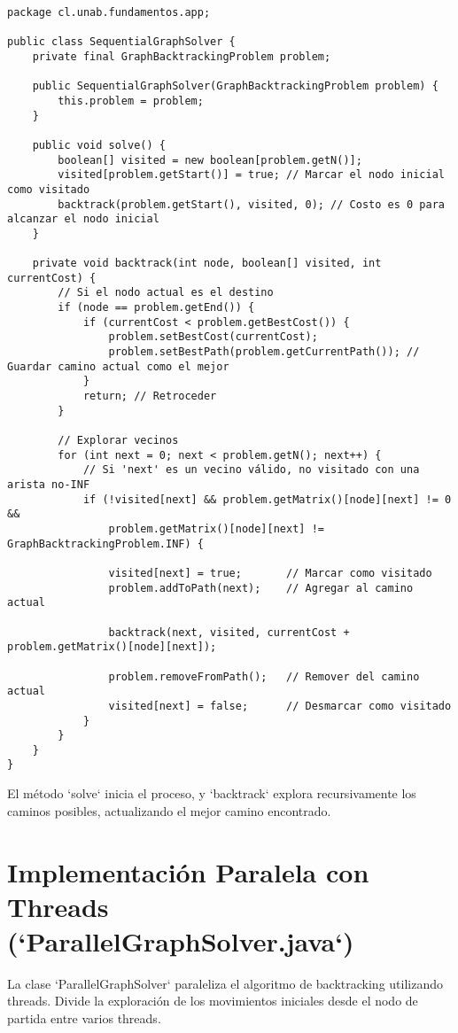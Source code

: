 \documentclass[12pt]{article}
\begin{document}
\begin{lstlisting}[caption={Algoritmo de Backtracking Secuencial en Java (`SequentialGraphSolver.java`)}]
package cl.unab.fundamentos.app;

public class SequentialGraphSolver {
    private final GraphBacktrackingProblem problem;

    public SequentialGraphSolver(GraphBacktrackingProblem problem) {
        this.problem = problem;
    }

    public void solve() {
        boolean[] visited = new boolean[problem.getN()];
        visited[problem.getStart()] = true; // Marcar el nodo inicial como visitado
        backtrack(problem.getStart(), visited, 0); // Costo es 0 para alcanzar el nodo inicial
    }

    private void backtrack(int node, boolean[] visited, int currentCost) {
        // Si el nodo actual es el destino
        if (node == problem.getEnd()) {
            if (currentCost < problem.getBestCost()) {
                problem.setBestCost(currentCost);
                problem.setBestPath(problem.getCurrentPath()); // Guardar camino actual como el mejor
            }
            return; // Retroceder
        }

        // Explorar vecinos
        for (int next = 0; next < problem.getN(); next++) {
            // Si 'next' es un vecino válido, no visitado con una arista no-INF
            if (!visited[next] && problem.getMatrix()[node][next] != 0 && 
                problem.getMatrix()[node][next] != GraphBacktrackingProblem.INF) {
                
                visited[next] = true;       // Marcar como visitado
                problem.addToPath(next);    // Agregar al camino actual
                
                backtrack(next, visited, currentCost + problem.getMatrix()[node][next]);
                
                problem.removeFromPath();   // Remover del camino actual
                visited[next] = false;      // Desmarcar como visitado
            }
        }
    }
}
\end{lstlisting}
El método `solve` inicia el proceso, y `backtrack` explora recursivamente los caminos posibles, actualizando el mejor camino encontrado.

\section*{Implementación Paralela con Threads (`ParallelGraphSolver.java`)}
La clase `ParallelGraphSolver` paraleliza el algoritmo de backtracking utilizando threads. Divide la exploración de los movimientos iniciales desde el nodo de partida entre varios threads.
\end{document}
